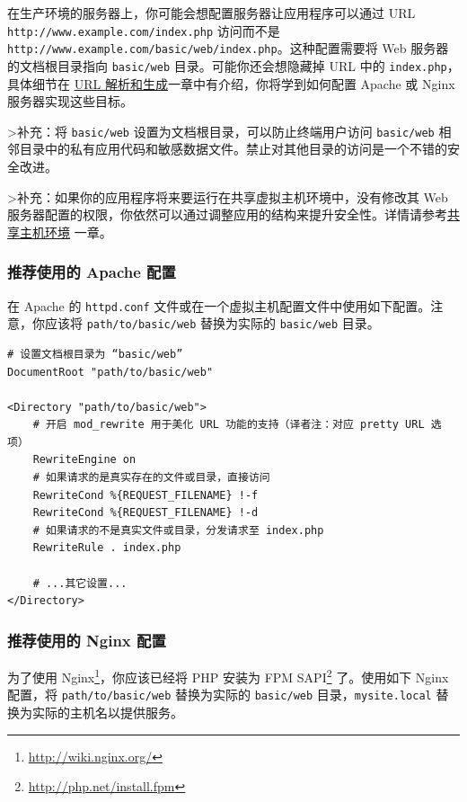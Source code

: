 在生产环境的服务器上，你可能会想配置服务器让应用程序可以通过 URL \lstinline|http://www.example.com/index.php| 访问而不是 \lstinline|http://www.example.com/basic/web/index.php|。这种配置需要将 Web 服务器的文档根目录指向 \lstinline|basic/web| 目录。可能你还会想隐藏掉 URL 中的 \lstinline|index.php|，具体细节在 \hyperref[runtime-url-handling.md]{URL 解析和生成}一章中有介绍，你将学到如何配置 Apache 或 Nginx 服务器实现这些目标。

>补充：将 \lstinline|basic/web| 设置为文档根目录，可以防止终端用户访问 \lstinline|basic/web| 相邻目录中的私有应用代码和敏感数据文件。禁止对其他目录的访问是一个不错的安全改进。

>补充：如果你的应用程序将来要运行在共享虚拟主机环境中，没有修改其 Web 服务器配置的权限，你依然可以通过调整应用的结构来提升安全性。详情请参考\hyperref[tutorial-shared-hosting.md]{共享主机环境} 一章。

\subsubsection{推荐使用的 Apache 配置 \label{start-installation.md::recommended-apache-configuration}}
在 Apache 的 \lstinline|httpd.conf| 文件或在一个虚拟主机配置文件中使用如下配置。注意，你应该将 \lstinline|path/to/basic/web| 替换为实际的 \lstinline|basic/web| 目录。

\begin{lstlisting}
# 设置文档根目录为 “basic/web”
DocumentRoot "path/to/basic/web"

<Directory "path/to/basic/web">
    # 开启 mod_rewrite 用于美化 URL 功能的支持（译者注：对应 pretty URL 选项）
    RewriteEngine on
    # 如果请求的是真实存在的文件或目录，直接访问
    RewriteCond %{REQUEST_FILENAME} !-f
    RewriteCond %{REQUEST_FILENAME} !-d
    # 如果请求的不是真实文件或目录，分发请求至 index.php
    RewriteRule . index.php

    # ...其它设置...
</Directory>
\end{lstlisting}
\subsubsection{推荐使用的 Nginx 配置 \label{start-installation.md::recommended-nginx-configuration}}
为了使用 Nginx\footnote{\url{http://wiki.nginx.org/}}，你应该已经将 PHP 安装为 FPM SAPI\footnote{\url{http://php.net/install.fpm}} 了。使用如下 Nginx 配置，将 \lstinline|path/to/basic/web| 替换为实际的 \lstinline|basic/web| 目录，\lstinline|mysite.local| 替换为实际的主机名以提供服务。

